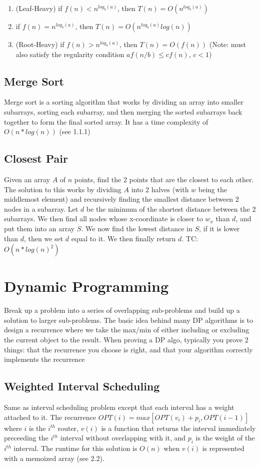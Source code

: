 \documentclass{article}
\begin{document}
\begin{enumerate}
    \item (Leaf-Heavy) if $f(n) < n^{log_b(a)}$, then  $T(n) = O(n^{log_b(a)})$
    \item if $f(n) = n^{log_b(a)}$, then $T(n) = O(n^{log_b(a)}log(n))$
    \item (Root-Heavy) if $f(n) > n^{log_b(a)}$, then $T(n) = O(f(n))$ (Note: must also satisfy the regularity condition $af(n/b) \leq cf(n)$, $c < 1$)
\end{enumerate}

\subsection{Merge Sort}
Merge sort is a sorting algorithm that works by dividing an array into smaller subarrays, sorting each subarray, and then merging the sorted subarrays back together to form the final sorted array. It has a time complexity of $O(n*log(n))$ (see 1.1.1)

\subsection{Closest Pair}
Given an array $A$ of $n$ points, find the 2 points that are the closest to each other. 
The solution to this works by dividing $A$ into 2 halves (with $w$ being the middlemost element) and recursively finding the smallest
distance between 2 nodes in a subarray. Let $d$ be the minimum of the shortest distance between
the 2 subarrays. We then find all nodes whose x-coordinate is closer to $w_x$ than $d$, and
put them into an array $S$. We now find the lowest distance in $S$, if it is lower than $d$, 
then we set $d$ equal to it. We then finally return $d$. TC: $O(n*log(n)^2)$

\section{Dynamic Programming}
Break up a problem into a series of overlapping sub-problems and build up a solution to larger sub-problems.
The basic idea behind many DP algorithms is to design a recurrence where we take the max/min of either including or excluding the current
object to the result. When proving a DP algo, typically you prove 2 things: that the recurrence you choose is right, and 
that your algorithm correctly implements the recurrence

\subsection{Weighted Interval Scheduling}
Same as interval scheduling problem except that each interval has a weight attached to it. 
The recurrence $OPT(i) = max[OPT(v_i) + p_i, OPT(i - 1)]$ where $i$ is the $i^{th}$ router, $v(i)$
is a function that returns the interval immediately preceeding the $i^{th}$ interval without overlapping with it, 
and $p_i$ is the weight of the $i^{th}$ interval. The runtime for this solution is $O(n)$ when $v(i)$ is 
represented with a memoized array (see 2.2).
\end{document}
